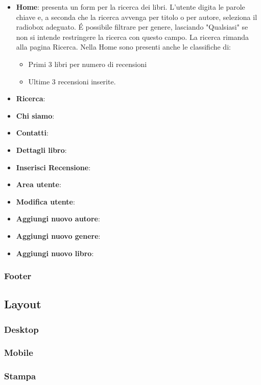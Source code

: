 \documentclass[12pt,a4paper,headings=optiontohead]{article}
\begin{document}
	\begin{itemize}
		\item \textbf{Home}: presenta un form per la ricerca dei libri. L'utente digita le parole chiave e, a seconda che la ricerca avvenga per titolo o per autore, seleziona il radiobox adeguato. \'E possibile filtrare per genere, lasciando "Qualsiasi" se non si intende restringere la ricerca con questo campo. La ricerca rimanda alla pagina Ricerca. Nella Home sono presenti anche le classifiche di:
		\begin{itemize}
			\item Primi 3 libri per numero di recensioni
			\item Ultime 3 recensioni inserite.
		\end{itemize} 
		\item \textbf{Ricerca}:
		\item \textbf{Chi siamo}:
		\item \textbf{Contatti}:
		\item \textbf{Dettagli libro}:
		\item \textbf{Inserisci Recensione}:
		\item \textbf{Area utente}:
		\item \textbf{Modifica utente}:
		\item \textbf{Aggiungi nuovo autore}:
		\item \textbf{Aggiungi nuovo genere}:
		\item \textbf{Aggiungi nuovo libro}:
	\end{itemize}
	
	
	
	
	
	
	\subsubsection{Footer}
	
	\subsection{Layout}
	\subsubsection{Desktop}
	\subsubsection{Mobile}
	\subsubsection{Stampa}
	
\end{document}
